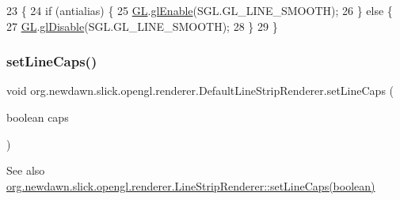 \begin{DoxyCode}
23                                                 \{
24         \textcolor{keywordflow}{if} (antialias) \{
25             \mbox{\hyperlink{classorg_1_1newdawn_1_1slick_1_1opengl_1_1renderer_1_1_default_line_strip_renderer_a8c4f5b0df77bf3a446d9d570f26e4171}{GL}}.\mbox{\hyperlink{interfaceorg_1_1newdawn_1_1slick_1_1opengl_1_1renderer_1_1_s_g_l_a35991f93081980b303d6ccc5bd88c8da}{glEnable}}(SGL.GL\_LINE\_SMOOTH);
26         \} \textcolor{keywordflow}{else} \{
27             \mbox{\hyperlink{classorg_1_1newdawn_1_1slick_1_1opengl_1_1renderer_1_1_default_line_strip_renderer_a8c4f5b0df77bf3a446d9d570f26e4171}{GL}}.\mbox{\hyperlink{interfaceorg_1_1newdawn_1_1slick_1_1opengl_1_1renderer_1_1_s_g_l_a3b47b402f84bc1404e6b218264981bb5}{glDisable}}(SGL.GL\_LINE\_SMOOTH);
28         \}
29     \}
\end{DoxyCode}
\mbox{\label{classorg_1_1newdawn_1_1slick_1_1opengl_1_1renderer_1_1_default_line_strip_renderer_a4ab21f80fe9663e729febb2206e201a5}} 
\subsubsection{\texorpdfstring{set\+Line\+Caps()}{setLineCaps()}}
{\footnotesize\ttfamily void org.\+newdawn.\+slick.\+opengl.\+renderer.\+Default\+Line\+Strip\+Renderer.\+set\+Line\+Caps (\begin{DoxyParamCaption}\item[{boolean}]{caps }\end{DoxyParamCaption})\hspace{0.3cm}{\ttfamily [inline]}}

\begin{DoxySeeAlso}{See also}
\mbox{\hyperlink{interfaceorg_1_1newdawn_1_1slick_1_1opengl_1_1renderer_1_1_line_strip_renderer_ac2c299158c60d76e8745759dd2dc8633}{org.\+newdawn.\+slick.\+opengl.\+renderer.\+Line\+Strip\+Renderer\+::set\+Line\+Caps(boolean)}} 
\end{DoxySeeAlso}


